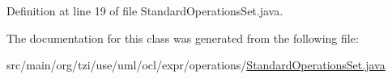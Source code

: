 Definition at line 19 of file Standard\-Operations\-Set.\-java.



The documentation for this class was generated from the following file\-:\begin{DoxyCompactItemize}
\item 
src/main/org/tzi/use/uml/ocl/expr/operations/\hyperlink{_standard_operations_set_8java}{Standard\-Operations\-Set.\-java}\end{DoxyCompactItemize}
